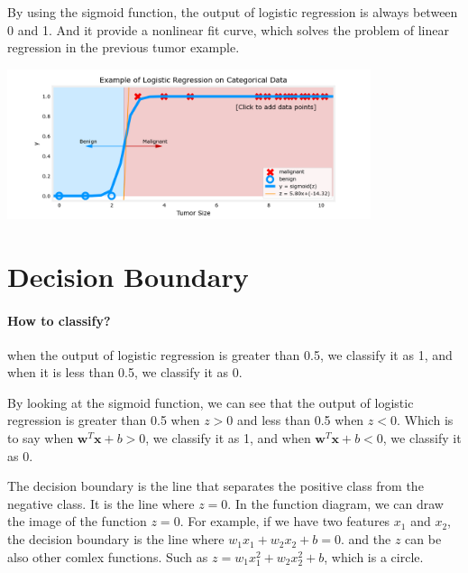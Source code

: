\begin{notebox}
    \hspace{2em}By using the sigmoid function, the output of logistic regression is always between 0 and 1.
    And it provide a nonlinear fit curve, which solves the problem of linear regression in the previous tumor example.
    
    \centering
    \includegraphics*[width=0.8\textwidth]{images/6.1.3}
\end{notebox}

\section{Decision Boundary}
\paragraph*{How to classify?}
when the output of logistic regression is greater than 0.5,
we classify it as 1, and when it is less than 0.5, we classify it as 0.
\par
By looking at the sigmoid function,
 we can see that the output of logistic regression is greater than 0.5 when $z > 0$ and less than 0.5 when $z < 0$.
Which is to say when $\mathbf{w}^T \mathbf{x} + b > 0$,
 we classify it as 1, and when $\mathbf{w}^T \mathbf{x} + b < 0$, we classify it as 0.\\

\begin{notebox}
    \hspace{2em}The decision boundary is the line that separates the positive class from the negative class.
    It is the line where $z=0$. In the function diagram, we can draw the image of the function $z=0$. For example,
    if we have two features $x_1$ and $x_2$, the decision boundary is the line where $w_1 x_1 + w_2 x_2 + b = 0$.
    and the $z$ can be also other comlex functions. Such as $z = w_1 x_1^2 + w_2 x_2^2 + b$, which is a circle.
\end{notebox}

